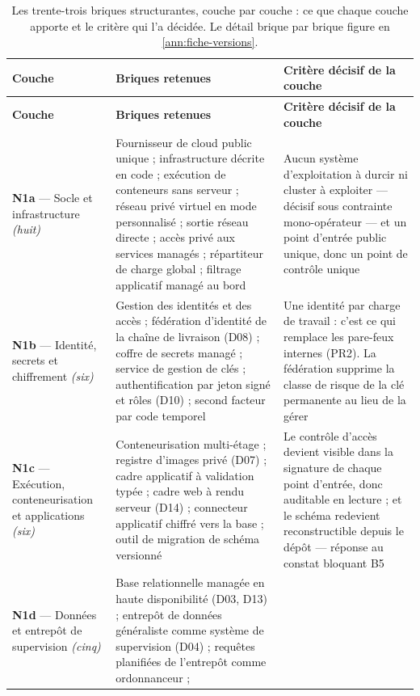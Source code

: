 \begingroup
\setlength{\tabcolsep}{2.5pt}
\renewcommand{\arraystretch}{1.0}
\begin{longtable}{|P{2.7cm}|P{6.3cm}|P{6.1cm}|}
\caption[Les trente-trois briques, par couche]{Les trente-trois briques structurantes, couche par
couche : ce que chaque couche apporte et le critère qui l'a décidée. Le détail brique par brique
figure en \cref{ann:fiche-versions}.}
\label{tab:synthese-couches}\\
\hline
\textbf{Couche} & \textbf{Briques retenues} & \textbf{Critère décisif de la couche} \\
\hline
\endfirsthead
\hline
\textbf{Couche} & \textbf{Briques retenues} & \textbf{Critère décisif de la couche} \\
\hline
\endhead
\hline
\endfoot
\textbf{N1a} --- Socle et infrastructure \emph{(huit)} &
Fournisseur de cloud public unique ; infrastructure décrite en code ; exécution de conteneurs sans
serveur ; réseau privé virtuel en mode personnalisé ; sortie réseau directe ; accès privé aux
services managés ; répartiteur de charge global ; filtrage applicatif managé au bord &
Aucun système d'exploitation à durcir ni cluster à exploiter --- décisif sous contrainte
mono-opérateur --- et un point d'entrée public unique, donc un point de contrôle unique \\ \hline
\textbf{N1b} --- Identité, secrets et chiffrement \emph{(six)} &
Gestion des identités et des accès ; fédération d'identité de la chaîne de livraison (D08) ; coffre
de secrets managé ; service de gestion de clés ; authentification par jeton signé et rôles (D10) ;
second facteur par code temporel &
Une identité par charge de travail : c'est ce qui remplace les pare-feux internes (PR2). La
fédération supprime la classe de risque de la clé permanente au lieu de la gérer \\ \hline
\textbf{N1c} --- Exécution, conteneurisation et applications \emph{(six)} &
Conteneurisation multi-étage ; registre d'images privé (D07) ; cadre applicatif à validation typée ;
cadre web à rendu serveur (D14) ; connecteur applicatif chiffré vers la base ; outil de migration de
schéma versionné &
Le contrôle d'accès devient visible dans la signature de chaque point d'entrée, donc auditable en
lecture ; et le schéma redevient reconstructible depuis le dépôt --- réponse au constat bloquant
B5 \\ \hline
\textbf{N1d} --- Données et entrepôt de supervision \emph{(cinq)} &
Base relationnelle managée en haute disponibilité (D03, D13) ; entrepôt de données généraliste
comme système de supervision (D04) ; requêtes planifiées de l'entrepôt comme ordonnanceur ;

\end{longtable}
